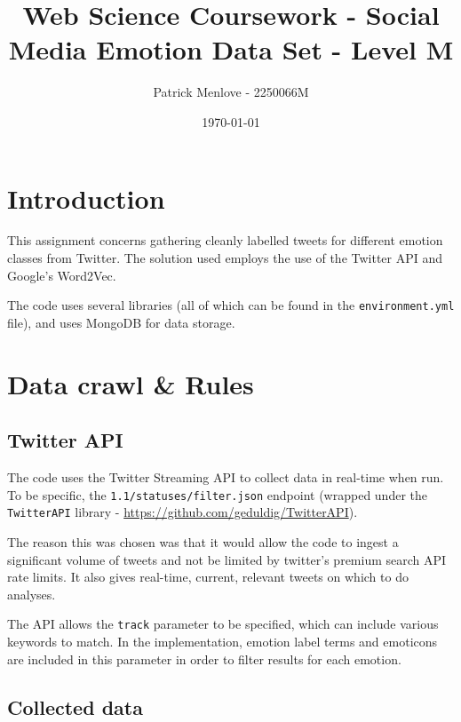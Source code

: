 \documentclass{mproj}
\begin{document}
\title{Web Science Coursework - Social Media Emotion Data Set - Level M}
\author{Patrick Menlove - 2250066M}
\date{\today}
\maketitle

\newpage

\section{Introduction}

This assignment concerns gathering cleanly labelled tweets for different emotion classes from Twitter. The solution used employs the use of the Twitter API and Google's Word2Vec.

The code uses several libraries (all of which can be found in the \lstinline{environment.yml} file), and uses MongoDB for data storage.

\section{Data crawl \& Rules}
\subsection{Twitter API}

The code uses the Twitter Streaming API to collect data in real-time when run. To be specific, the \lstinline!1.1/statuses/filter.json! endpoint (wrapped under the \lstinline{TwitterAPI} library - \url{https://github.com/geduldig/TwitterAPI}).

The reason this was chosen was that it would allow the code to ingest a significant volume of tweets and not be limited by twitter's premium search API rate limits. It also gives real-time, current, relevant tweets on which to do analyses.

The API allows the \lstinline{track} parameter to be specified, which can include various keywords to match. In the implementation, emotion label terms and emoticons are included in this parameter in order to filter results for each emotion.

\subsection{Collected data}
\end{document}
